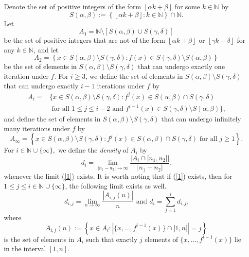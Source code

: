 \documentclass{amsart}
\theoremstyle{definition}
\numberwithin{equation}{section}%
\begin{document}
Denote the set of positive integers of the form $\left\lfloor \alpha k+\beta \right\rfloor$ for some $k\in \mathbb{N}$ by 
\[
S(\alpha ,\beta ):=\left\{ \left\lfloor \alpha k+\beta \right\rfloor :k\in 
\mathbb{N}\right\} \cap \mathbb{N}.
\]
Let 
\begin{equation*}
A_{1} =\mathbb{N}\setminus \left[ S(\alpha ,\beta )\cup S(\gamma ,\delta )\right]
\end{equation*}
be the set of positive integers that are not of the form $\left\lfloor \alpha k+\beta \right\rfloor$ or $\left\lfloor \gamma k+\delta \right\rfloor$ for any $k\in \mathbb{N}$, and let
\begin{equation*}
 A_{2} =\left\{ x\in S(\alpha ,\beta )\setminus S(\gamma ,\delta ):f(x)\in
S(\gamma ,\delta )\setminus S(\alpha ,\beta )\right\} 
\end{equation*}
be the set of elements in $S(\alpha ,\beta )\setminus S(\gamma ,\delta )$ that can undergo exactly one iteration under $f$. For $i\geq 3$, we define the set of elements in $S(\alpha ,\beta )\setminus S(\gamma ,\delta )$ that can undergo exactly $i-1$ iterations under $f$ by
\begin{align*}
A_{i} =&\{x\in S(\alpha ,\beta )\setminus S(\gamma ,\delta ):f^{j}(x)\in
S(\alpha ,\beta )\cap S(\gamma ,\delta ) \\
&\text{ for all }1 \leq j\leq i-2\text{ and }f^{i-1}(x)\in S(\gamma ,\delta)\setminus S(\alpha ,\beta )\}\text{,}
\end{align*}
and define the set of elements in $S(\alpha ,\beta )\setminus S(\gamma ,\delta )$ that can undergo infinitely many iterations under $f$ by
\[
A_{\infty }=\left\{ x\in S(\alpha ,\beta )\setminus S(\gamma ,\delta
):f^{j}(x)\in S(\alpha ,\beta )\cap S(\gamma ,\delta )\text{ for all }j\geq
1\right\} \text{.} 
\]
For $i\in \mathbb{N}\cup \{\infty \},$ we define the \emph{density} of $A_i$ by
\begin{equation}
d_{i}=\lim_{\left\vert n_{1}-n_{2}\right\vert \rightarrow \infty }\frac{\left\vert A_{i}\cap \lbrack n_{1},n_{2}]\right\vert }{\left\vert
n_{1}-n_{2}\right\vert }\text{,}  \label{1}
\end{equation}
whenever the limit (\ref{1}) exists. It is worth noting that if (\ref{1}) exists, then for $1\leq j\leq i\in \mathbb{N}\cup \{\infty \}$, the following limit exists as well. 
\[
d_{i,j}=\lim_{n\rightarrow \infty }\frac{\left\vert A_{i,j}(n)\right\vert }{n}\text{ and }d_{i}=\sum_{j=1}^{i}d_{i,j}\text{,} 
\]
where 
\[
A_{i,j}(n):=\left\{ x\in A_{i}:\left\vert \{x,\ldots ,f^{i-1}(x)\}\cap
\lbrack 1,n]\right\vert =j\right\}
\]
is the set of elements in $A_i$ such that exactly $j$ elements of $\{x,\ldots ,f^{i-1}(x)\}$ lie in the interval $[1,n]$.
\end{document}
